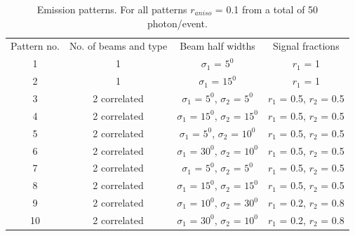 \begin{table}[h]
  \centering
  \caption{Emission patterns. For all patterns $r_{aniso}$ = 0.1 from a 
  total of 50 photon/event.}
  \label{tab:AnisoPattern}
  \begin{tabular}{|c | c| c | c|}
  \hline
  Pattern no. & No. of beams and type & Beam half widths & Signal fractions \\
  1 & 1 & $\sigma_1$ = $5^{0}$ & $r_1$ = 1 \\
   2 & 1 & $\sigma_1$ = $15^{0}$ & $r_1$ = 1 \\
   3 & 2 correlated & $\sigma_1$ = $5^{0}$, $\sigma_2$ = $5^{0}$ & $r_1$ = 0.5, $r_2$ = 0.5  \\
   4 & 2 correlated & $\sigma_1$ = $15^{0}$, $\sigma_2$ = $15^{0}$ & $r_1$ = 0.5, $r_2$ = 0.5 \\
   5 & 2 correlated & $\sigma_1$ = $5^{0}$, $\sigma_2$ = $10^{0}$ & $r_1$ = 0.5, $r_2$ = 0.5 \\
   6 & 2 correlated & $\sigma_1$ = $30^{0}$, $\sigma_2$ = $10^{0}$ & $r_1$ = 0.5, $r_2$ = 0.5 \\
   7 & 2 correlated & $\sigma_1$ = $5^{0}$, $\sigma_2$ = $5^{0}$ & $r_1$ = 0.5, $r_2$ = 0.5 \\
   8 & 2 correlated & $\sigma_1$ = $15^{0}$, $\sigma_2$ = $15^{0}$ & $r_1$ = 0.5, $r_2$ = 0.5 \\
   9 & 2 correlated & $\sigma_1$ = $10^{0}$, $\sigma_2$ = $30^{0}$ & $r_1$ = 0.2, $r_2$ = 0.8 \\
    10 & 2 correlated & $\sigma_1$ = $30^{0}$, $\sigma_2$ = $10^{0}$ & $r_1$ = 0.2, $r_2$ = 0.8 \\
  \hline
 \end{tabular}
\end{table}

